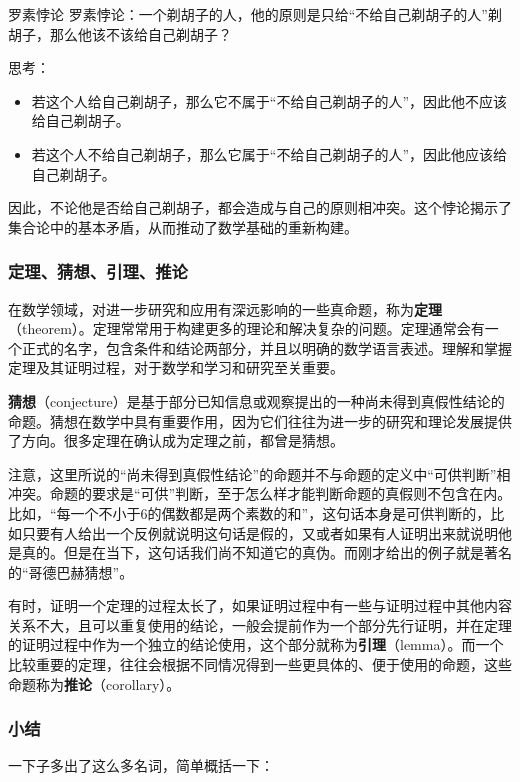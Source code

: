 \begin{example}{罗素悖论}
罗素悖论：一个剃胡子的人，他的原则是只给“不给自己剃胡子的人”剃胡子，那么他该不该给自己剃胡子？

思考：
\begin{itemize}
\item 若这个人给自己剃胡子，那么它不属于“不给自己剃胡子的人”，因此他不应该给自己剃胡子。
\item 若这个人不给自己剃胡子，那么它属于“不给自己剃胡子的人”，因此他应该给自己剃胡子。
\end{itemize}
因此，不论他是否给自己剃胡子，都会造成与自己的原则相冲突。这个悖论揭示了集合论中的基本矛盾，从而推动了数学基础的重新构建。
\end{example}

\subsubsection{定理、猜想、引理、推论}

在数学领域，对进一步研究和应用有深远影响的一些真命题，称为\textbf{定理}（theorem）。定理常常用于构建更多的理论和解决复杂的问题。定理通常会有一个正式的名字，包含条件和结论两部分，并且以明确的数学语言表述。理解和掌握定理及其证明过程，对于数学和学习和研究至关重要。

\textbf{猜想}（conjecture）是基于部分已知信息或观察提出的一种尚未得到真假性结论的命题。猜想在数学中具有重要作用，因为它们往往为进一步的研究和理论发展提供了方向。很多定理在确认成为定理之前，都曾是猜想。

注意，这里所说的“尚未得到真假性结论”的命题并不与命题的定义中“可供判断”相冲突。命题的要求是“可供”判断，至于怎么样才能判断命题的真假则不包含在内。比如，“每一个不小于6的偶数都是两个素数的和”，这句话本身是可供判断的，比如只要有人给出一个反例就说明这句话是假的，又或者如果有人证明出来就说明他是真的。但是在当下，这句话我们尚不知道它的真伪。而刚才给出的例子就是著名的“哥德巴赫猜想”。

有时，证明一个定理的过程太长了，如果证明过程中有一些与证明过程中其他内容关系不大，且可以重复使用的结论，一般会提前作为一个部分先行证明，并在定理的证明过程中作为一个独立的结论使用，这个部分就称为\textbf{引理}（lemma）。而一个比较重要的定理，往往会根据不同情况得到一些更具体的、便于使用的命题，这些命题称为\textbf{推论}（corollary）。

\subsubsection{小结}

一下子多出了这么多名词，简单概括一下：

